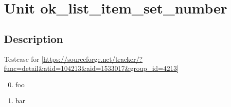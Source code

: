 \documentclass{report}
\begin{document}
\label{toc}\tableofcontents
\newpage
\newlength{\tmplength}
\chapter{Unit ok{\_}list{\_}item{\_}set{\_}number}
\label{ok_list_item_set_number}
\section{Description}
Testcase for [\href{https://sourceforge.net/tracker/?func=detail&atid=104213&aid=1533017&group_id=4213}{https://sourceforge.net/tracker/?func=detail{\&}atid=104213{\&}aid=1533017{\&}group{\_}id=4213}]\hfill\vspace*{1ex}



\begin{enumerate}
\setcounter{enumi}{-1} \setcounter{enumii}{-1} \setcounter{enumiii}{-1} \setcounter{enumiv}{-1} 
\item foo
\setcounter{enumi}{0} \setcounter{enumii}{0} \setcounter{enumiii}{0} \setcounter{enumiv}{0} 
\item bar
\end{enumerate}
\end{document}
